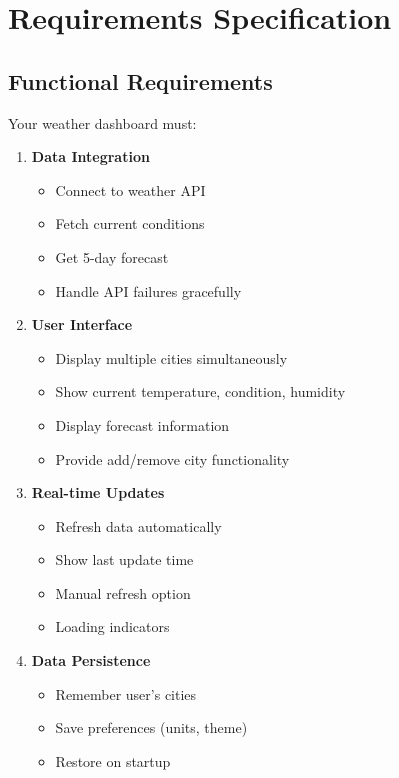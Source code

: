 \documentclass[
  letterpaper,
  DIV=11,
  numbers=noendperiod,
  oneside]{scrreprt}
\providecommand{\tightlist}{%
  \setlength{\itemsep}{0pt}\setlength{\parskip}{0pt}}\usepackage{longtable,booktabs,array}
\begin{document}
\section{Requirements Specification}\label{requirements-specification-9}

\subsection{Functional Requirements}\label{functional-requirements-9}

Your weather dashboard must:

\begin{enumerate}
\def\labelenumi{\arabic{enumi}.}
\tightlist
\item
  \textbf{Data Integration}

  \begin{itemize}
  \tightlist
  \item
    Connect to weather API
  \item
    Fetch current conditions
  \item
    Get 5-day forecast
  \item
    Handle API failures gracefully
  \end{itemize}
\item
  \textbf{User Interface}

  \begin{itemize}
  \tightlist
  \item
    Display multiple cities simultaneously
  \item
    Show current temperature, condition, humidity
  \item
    Display forecast information
  \item
    Provide add/remove city functionality
  \end{itemize}
\item
  \textbf{Real-time Updates}

  \begin{itemize}
  \tightlist
  \item
    Refresh data automatically
  \item
    Show last update time
  \item
    Manual refresh option
  \item
    Loading indicators
  \end{itemize}
\item
  \textbf{Data Persistence}

  \begin{itemize}
  \tightlist
  \item
    Remember user's cities
  \item
    Save preferences (units, theme)
  \item
    Restore on startup
  \end{itemize}
\end{enumerate}
\end{document}
